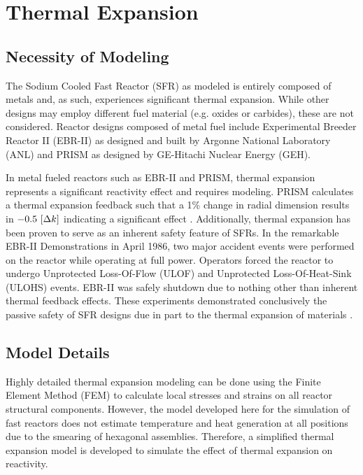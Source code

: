 \chapter{Thermal Expansion}
\label{ch:thermalExpansion}

\section{Necessity of Modeling}
  The Sodium Cooled Fast Reactor (SFR) as modeled is entirely composed of
  metals and, as such, experiences significant thermal expansion. While other 
  designs may employ different fuel material (e.g. oxides or carbides), these 
  are not considered. Reactor designs composed of metal fuel include 
  Experimental Breeder Reactor II (EBR-II) as designed and built by Argonne 
  National Laboratory (ANL) and PRISM as designed by GE-Hitachi Nuclear Energy 
  (GEH).

  In metal fueled reactors such as EBR-II and PRISM, thermal expansion 
  represents a significant reactivity effect and requires modeling. PRISM 
  calculates a thermal expansion feedback such that a 1\% change in radial 
  dimension results in $-0.5 \,\left[\text{{$\Delta k$}}\right]$ indicating a significant effect 
  \cite{GEFR793}. Additionally, thermal expansion has been proven to serve as an 
  inherent safety feature of SFRs. In the remarkable EBR-II Demonstrations in 
  April 1986, two major accident events were performed on the reactor while 
  operating at full power. Operators forced the reactor to undergo Unprotected 
  Loss-Of-Flow (ULOF) and Unprotected Loss-Of-Heat-Sink (ULOHS) events. EBR-II 
  was safely shutdown due to nothing other than inherent thermal feedback 
  effects. These experiments demonstrated conclusively the passive safety of SFR
  designs due in part to the thermal expansion of materials 
  \cite{PlentifulEnergy}.

\section{Model Details}
  \label{sec:model_details}
  Highly detailed thermal expansion modeling can be done using the Finite
  Element Method (FEM) to calculate local stresses and strains on all reactor
  structural components. However, the model developed here for the simulation of
  fast reactors does not estimate temperature and heat generation at all 
  positions due to the smearing of hexagonal assemblies. Therefore, a simplified 
  thermal expansion model is developed to simulate the effect of thermal 
  expansion on reactivity.

